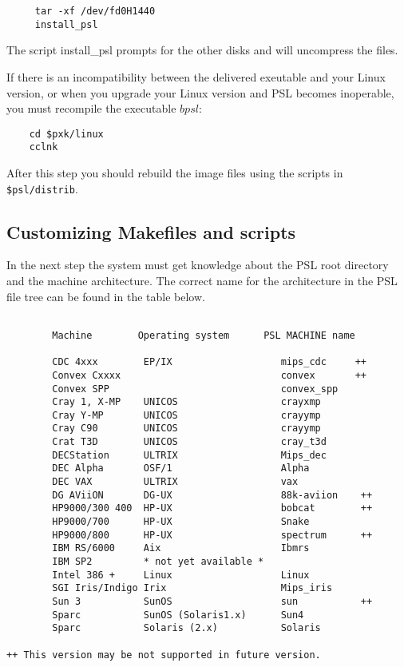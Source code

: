 \begin{verbatim}
     tar -xf /dev/fd0H1440
     install_psl
\end{verbatim}

The script install\_psl prompts for the other disks and will uncompress the
files.

If there is an incompatibility between the delivered exeutable and
your Linux version, or when you upgrade your Linux version
and {\small PSL} becomes inoperable, you must recompile the
executable $bpsl$:
\begin{verbatim}
    cd $pxk/linux
    cclnk
\end{verbatim}
After this step you should rebuild the image files using the
scripts in \verb+$psl/distrib+.

\subsection{Customizing Makefiles and scripts}

In the next step the system must get knowledge about the PSL root directory
and the machine architecture. The correct name for the architecture in the
PSL file tree can be found in the table below.  
\begin{verbatim}

        Machine        Operating system      PSL MACHINE name 
        
        CDC 4xxx        EP/IX                   mips_cdc     ++
        Convex Cxxxx                            convex       ++
        Convex SPP                              convex_spp
        Cray 1, X-MP    UNICOS                  crayxmp
        Cray Y-MP       UNICOS                  crayymp
        Cray C90        UNICOS                  crayymp
        Crat T3D        UNICOS                  cray_t3d
        DECStation      ULTRIX                  Mips_dec
        DEC Alpha       OSF/1                   Alpha
        DEC VAX         ULTRIX                  vax
        DG AViiON       DG-UX                   88k-aviion    ++
        HP9000/300 400  HP-UX                   bobcat        ++
        HP9000/700      HP-UX                   Snake
        HP9000/800      HP-UX                   spectrum      ++
        IBM RS/6000     Aix                     Ibmrs	
        IBM SP2         * not yet available *
        Intel 386 +     Linux                   Linux
        SGI Iris/Indigo Irix                    Mips_iris
        Sun 3           SunOS                   sun           ++
        Sparc           SunOS (Solaris1.x)      Sun4
        Sparc           Solaris (2.x)           Solaris

++ This version may be not supported in future version.
        
\end{verbatim}

